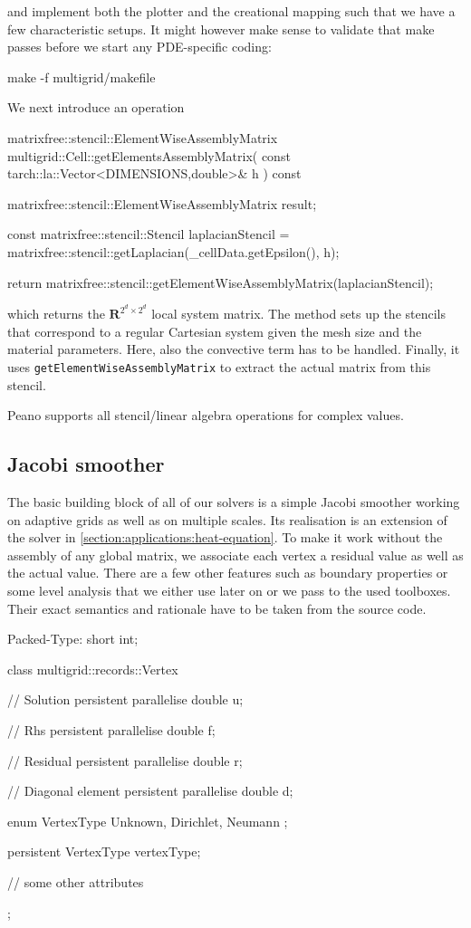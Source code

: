 \noindent
and implement both the plotter and the creational mapping such that we have a
few characteristic setups. 
It might however make sense to validate that make passes before we start any
PDE-specific coding:
\begin{code}
make -f multigrid/makefile
\end{code}


\noindent
We next introduce an operation 
\begin{code}
matrixfree::stencil::ElementWiseAssemblyMatrix multigrid::Cell::getElementsAssemblyMatrix(
  const tarch::la::Vector<DIMENSIONS,double>&  h
) const {
  matrixfree::stencil::ElementWiseAssemblyMatrix result;

  const matrixfree::stencil::Stencil laplacianStencil = 
    matrixfree::stencil::getLaplacian(_cellData.getEpsilon(), h);

  return matrixfree::stencil::getElementWiseAssemblyMatrix(laplacianStencil);
}
\end{code}
which returns the $\mathbf{R}^{2^d \times 2^d}$ local system matrix. 
The method sets up the stencils that correspond to a regular Cartesian system
given the mesh size  and the material parameters.
Here, also the convective term has to be handled.
Finally, it uses \texttt{getElementWiseAssemblyMatrix} to extract the actual
matrix from this stencil.

\begin{remark}
  Peano supports all stencil/linear algebra operations for complex values.
\end{remark}


\subsection{Jacobi smoother}

The basic building block of all of our solvers is a simple Jacobi smoother
working on adaptive grids as well as on multiple scales.
Its realisation is an extension of the solver in \ref{section:applications:heat-equation}.
To make it work without the assembly of any global matrix, we associate each
vertex a residual value as well as the actual value. 
There are a few other features such as boundary properties or some level
analysis that we either use later on or we pass to the used toolboxes. 
Their exact semantics and rationale have to be taken from the source code.

\begin{code}
Packed-Type: short int;


class multigrid::records::Vertex {  
  // Solution
  persistent parallelise double  u;

  // Rhs
  persistent parallelise double  f;
  
  // Residual
  persistent parallelise double   r;

  // Diagonal element
  persistent parallelise double   d;
  
  enum VertexType {
    Unknown, Dirichlet, Neumann
  };
  
  persistent VertexType vertexType;
  
  // some other attributes
};
\end{code}

